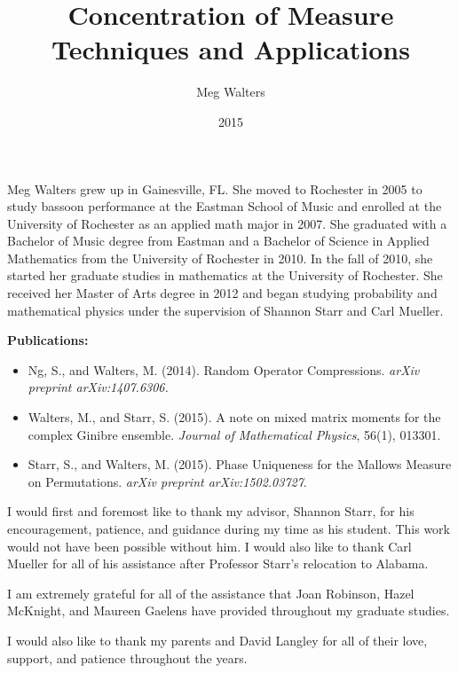 \documentclass[12pt]{report}
\theoremstyle{definition}
\begin{document}
\title{Concentration of Measure Techniques and Applications}
\author{Meg Walters}
\date{2015}
\maketitle

\begin{curriculumvitae}
Meg Walters grew up in Gainesville, FL.  She moved to Rochester in 2005 to study bassoon performance at the Eastman School of Music and enrolled at the University of Rochester as an applied math major in 2007.  She graduated with a Bachelor of Music degree from Eastman and a Bachelor of Science in Applied Mathematics from the University of Rochester in 2010.  In the fall of 2010, she started her graduate studies in mathematics at the University of Rochester.  She received her Master of Arts degree in 2012 and began studying probability and mathematical physics under the supervision of Shannon Starr and Carl Mueller.  
\vfill

{\bf Publications:}
\begin{itemize}
\item Ng, S., and Walters, M. (2014). Random Operator Compressions. {\em arXiv preprint arXiv:1407.6306.}
\item Walters, M., and Starr, S. (2015). A note on mixed matrix moments for the complex Ginibre ensemble. {\em Journal of Mathematical Physics}, 56(1), 013301.
\item Starr, S., and Walters, M. (2015). Phase Uniqueness for the Mallows Measure on Permutations. {\em arXiv preprint arXiv:1502.03727}.
\end{itemize}
\end{curriculumvitae}

\begin{acknowledgments}
I would first and foremost like to thank my advisor, Shannon Starr, for his encouragement, patience, and guidance during my time as his student.  This work would not have been possible without him.  I would also like to thank Carl Mueller for all of his assistance after Professor Starr's relocation to Alabama.  

I am extremely grateful for all of the assistance that Joan Robinson, Hazel McKnight, and Maureen Gaelens have provided throughout my graduate studies.  

I would also like to thank my parents and David Langley for all of their love, support, and patience throughout the years.  
  
\end{acknowledgments}
\end{document}
